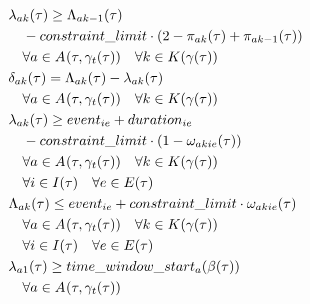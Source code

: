 \begin{alignat}{2}
	& \VarStartOfSegment{\ElementActivity}{\ElementWorkSegment} \geq \VarFinishOfSegment{\ElementActivity}{\ElementWorkSegment-1} \notag\\
	& \quad - \ParConstraintLimit \cdot (2 - \VarActiveSegment{\ElementActivity}{\ElementWorkSegment} + \VarActiveSegment{\ElementActivity}{\ElementWorkSegment-1})                \notag\\
	& \quad \forall \ElementActivity \in \SetActivity{\VarSupervisorAssignment{}{\ElementTechnician}}{} \quad\forall \ElementWorkSegment \in \SetWorkSegment \\ 
	& \VarProcessingTime = \VarFinishOfSegment{\ElementActivity}{\ElementWorkSegment} - \VarStartOfSegment{\ElementActivity}{\ElementWorkSegment} \notag\\                                                                                       
	& \quad \forall \ElementActivity \in \SetActivity{\VarSupervisorAssignment{}{\ElementTechnician}}{}  \quad\forall \ElementWorkSegment \in \SetWorkSegment \\
	& \VarStartOfSegment{\ElementActivity}{\ElementWorkSegment} \geq \ParEvent + \ParEventDuration \notag\\
	& \quad - \ParConstraintLimit \cdot (1 - \VarSegmentInRelation)                                             \notag\\ 
	& \quad \forall \ElementActivity \in \SetActivity{\VarSupervisorAssignment{}{\ElementTechnician}}{}  \quad\forall \ElementWorkSegment \in \SetWorkSegment \notag\\
	& \quad \forall i \in \SetTimeInstance  \quad\forall \ElementEvent \in \SetEvent                                \\
	& \VarFinishOfSegment{\ElementActivity}{\ElementWorkSegment} \leq \ParEvent + \ParConstraintLimit \cdot \VarSegmentInRelation                                                                      \notag\\ 
	& \quad \forall \ElementActivity \in \SetActivity{\VarSupervisorAssignment{}{\ElementTechnician}}{}  \quad\forall \ElementWorkSegment \in \SetWorkSegment \notag\\
	& \quad \forall i \in \SetTimeInstance  \quad\forall \ElementEvent \in \SetEvent                                \\
	& \VarStartOfSegment{\ElementActivity}{1} \geq \ParTimeWindowStart \notag\\
	& \quad \forall \ElementActivity \in \SetActivity{\VarSupervisorAssignment{}{\ElementTechnician}}{}                                                          \\

\end{alignat}
